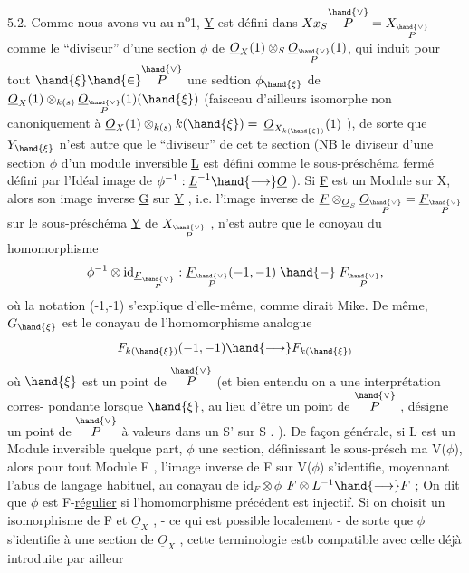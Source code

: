 5.2. Comme nous avons vu au n\textsuperscript{o}1, \underline{Y} est d\'efini dans $X x_S \overset{\hand{\vee}}{P} = X_{\overset{\hand{\vee}}{P}}$
comme le ``diviseur'' d'une section $\phi$ de $\underline{O}_X(1)\otimes_S \underline{O}_{\overset{\hand{\vee}}{P}}(1)$, qui induit pour
tout $\hand{\xi} \hand{\in} \overset{\hand{\vee}}{P}$ une sedtion $\phi_{\hand{\xi}}$ de  $\underline{O}_X(1)\otimes_{k(s)}\underline{O}_{\overset{\hand{\vee}}{P}}(1)(\hand{\xi})$
(faisceau d'ailleurs isomorphe non canoniquement \`a $\underline{O}_X(1)\otimes_{k(s)}k(\hand{\xi}) =$
$\underline{O}_{X_{k(\hand{\xi})}}(1)$ ), de sorte que $Y_{\hand{\xi}}$ n'est autre que le  ``diviseur'' de cet
te section (NB le diviseur d'une section $\phi$ d'un module inversible \underline{L} \placedmargin{$/\!/$}
est d\'efini comme le sous-pr\'esch\'ema ferm\'e d\'efini par l'Id\'eal image de
$\phi^{-1} : \underline{L}^{-1} \hand{\longrightarrow} \underline{O}$ ). Si \underline{F} est un Module sur X, alors son image inverse \underline{G}
sur \underline{Y} , i.e. l'image inverse de $\underline{F}\otimes_{\underline{O}_S}\underline{O}_{\overset{\hand{\vee}}{P}} = \underline{F}_{\overset{\hand{\vee}}{P}}$ sur le sous-pr\'esch\'ema \underline{Y} de
$X_{\overset{\hand{\vee}}{P}}$ , n'est autre que le conoyau du homomorphisme
\[ \phi^{-1}\otimes \mathrm{id}_{\underline{F}_{\overset{\hand{\vee}}{P}}} : \underline{F}_{\overset{\hand{\vee}}{P}}(-1,-1) \mathrel{\hand{-}} F_{\overset{\hand{\vee}}{P}} , \]
o\`u la notation (-1,-1) s'explique d'elle-m\^eme, comme dirait Mike. De
m\^eme, $G_{\hand{\xi}}$ est le conayau de l'homomorphisme analogue
\[ F_{k(\hand{\xi})}(-1,-1) \hand{\longrightarrow} F_{k(\hand{\xi})} \]
o\`u $\hand{\xi}$ est un point de $\overset{\hand{\vee}}{P}$ (et bien entendu on a une interpr\'etation corres-%
pondante lorsque $\hand{\xi}$, au lieu d'\^etre un point de $\overset{\hand{\vee}}{P}$ , d\'esigne un point
de $\overset{\hand{\vee}}{P}$ \`a valeurs dans un S' sur S . ). \hand{\unsure{(}}De fa\c{c}on g\'en\'erale, si L est un
Module inversible quelque part, $\phi$ une section, d\'efinissant le sous-pr\'esch
ma V($\phi$), alors pour tout Module F , l'image inverse de F sur V($\phi$)
s'identifie, moyennant l'abus de langage habituel, au conayau de $\mathrm{id}_F\otimes\phi$
$F\otimes L^{-1} \hand{\longrightarrow} F$ ; On dit que $\phi$ est F-\uline{r\'egulier} si l'homomorphisme pr\'ec\'edent
est injectif. Si on choisit un isomorphisme de F et $\underline{O}_X$ , - ce qui
est possible localement - de sorte que $\phi$ s'identifie \`a une section de
$\underline{O}_X$ , cette terminologie estb compatible avec celle d\'ej\`a introduite par ailleur


